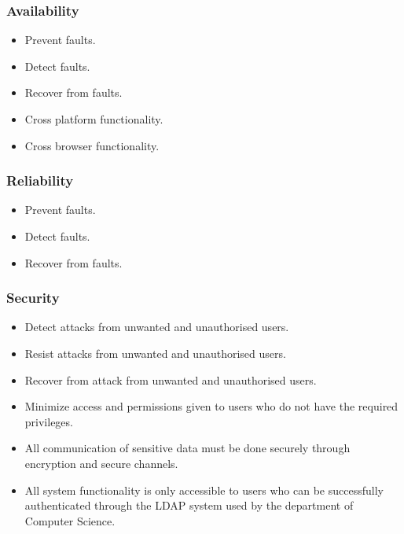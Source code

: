\documentclass[12pt, oneside]{article}
\begin{document}
		\subsubsection{Availability}
		\begin{itemize}
			\item Prevent faults.
			\item Detect faults.
			\item Recover from faults.
			\item Cross platform functionality.
			\item Cross browser functionality.
		\end{itemize}
		
		\subsubsection{Reliability}
		\begin{itemize}
			\item Prevent faults.
			\item Detect faults.
			\item Recover from faults.
		\end{itemize}
	
		\subsubsection{Security}
			\begin{itemize}
				\item Detect attacks from unwanted and unauthorised users.
				\item Resist attacks from unwanted and unauthorised users.
				\item Recover from attack from unwanted and unauthorised users.
				\item Minimize access and permissions given to users who do not have the required privileges.
				\item All communication of sensitive data must be done securely through encryption and secure channels.
				\item All system functionality is only accessible to users who can be successfully authenticated through the LDAP system used by the department of Computer Science.
			\end{itemize}
\end{document}
